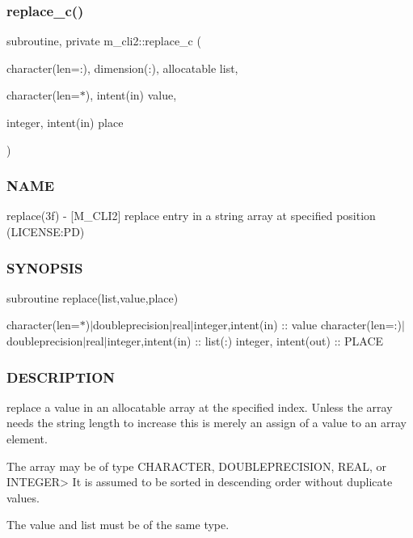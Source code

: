 \mbox{\label{namespacem__cli2_affd644ac84d1010b40748f80d142d6b3}} 
\subsubsection{\texorpdfstring{replace\+\_\+c()}{replace\_c()}}
{\footnotesize\ttfamily subroutine, private m\+\_\+cli2\+::replace\+\_\+c (\begin{DoxyParamCaption}\item[{character(len=\+:), dimension(\+:), allocatable}]{list,  }\item[{character(len=$\ast$), intent(in)}]{value,  }\item[{integer, intent(in)}]{place }\end{DoxyParamCaption})\hspace{0.3cm}{\ttfamily [private]}}



\subsubsection*{N\+A\+ME}

replace(3f) -\/ \mbox{[}M\+\_\+\+C\+L\+I2\mbox{]} replace entry in a string array at specified position (L\+I\+C\+E\+N\+SE\+:PD) 

\subsubsection*{S\+Y\+N\+O\+P\+S\+IS}

subroutine replace(list,value,place)

character(len=$\ast$)$\vert$doubleprecision$\vert$real$\vert$integer,intent(in) \+:\+: value character(len=\+:)$\vert$doubleprecision$\vert$real$\vert$integer,intent(in) \+:\+: list(\+:) integer, intent(out) \+:\+: P\+L\+A\+CE

\subsubsection*{D\+E\+S\+C\+R\+I\+P\+T\+I\+ON}

\begin{DoxyVerb}replace a value in an allocatable array at the specified index. Unless the
array needs the string length to increase this is merely an assign of a value
to an array element.

The array may be of type CHARACTER, DOUBLEPRECISION, REAL, or INTEGER>
It is assumed to be sorted in descending order without duplicate values.

The value and list must be of the same type.
\end{DoxyVerb}


